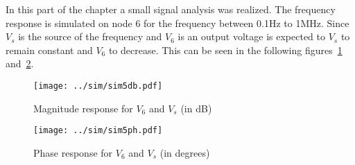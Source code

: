 In this part of the chapter a small signal analysis was realized. The frequency response is simulated on node 6 for the frequency between 0.1Hz to 1MHz. 
Since $V_{s}$ is the source of the frequency and $V_{6}$ is an output voltage is expected to $V_{s}$ to remain constant and $V_{6}$ to decrease. This can be seen in the following figures~\ref{fig:sim5db} and~\ref{fig:sim5ph}. 
\begin{figure}[H] \centering
\texttt{[image: ../sim/sim5db.pdf]}
\caption{Magnitude response for $V_{6}$ and $V_{s}$ (in dB)} 
\label{fig:sim5db}
\end{figure}
\begin{figure}[H] \centering
\texttt{[image: ../sim/sim5ph.pdf]}
\caption{Phase response for $V_{6}$ and $V_{s}$ (in degrees)} 
\label{fig:sim5ph}
\end{figure}




